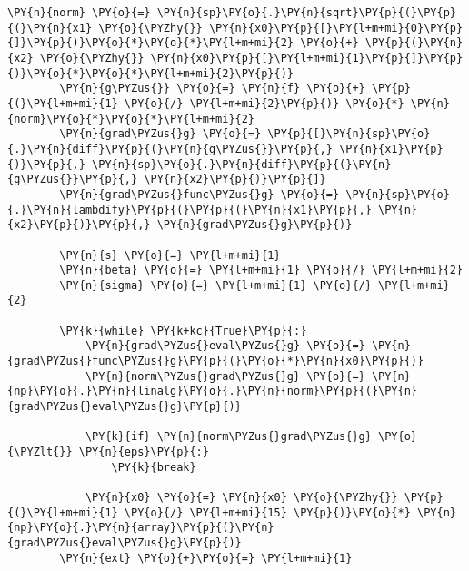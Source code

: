 \begin{itemize}
\begin{tcolorbox}[breakable, size=fbox, boxrule=1pt, pad at break*=1mm,colback=cellbackground, colframe=cellborder]
\begin{Verbatim}[commandchars=\\\{\}]
        \PY{n}{norm} \PY{o}{=} \PY{n}{sp}\PY{o}{.}\PY{n}{sqrt}\PY{p}{(}\PY{p}{(}\PY{n}{x1} \PY{o}{\PYZhy{}} \PY{n}{x0}\PY{p}{[}\PY{l+m+mi}{0}\PY{p}{]}\PY{p}{)}\PY{o}{*}\PY{o}{*}\PY{l+m+mi}{2} \PY{o}{+} \PY{p}{(}\PY{n}{x2} \PY{o}{\PYZhy{}} \PY{n}{x0}\PY{p}{[}\PY{l+m+mi}{1}\PY{p}{]}\PY{p}{)}\PY{o}{*}\PY{o}{*}\PY{l+m+mi}{2}\PY{p}{)}
        \PY{n}{g\PYZus{}} \PY{o}{=} \PY{n}{f} \PY{o}{+} \PY{p}{(}\PY{l+m+mi}{1} \PY{o}{/} \PY{l+m+mi}{2}\PY{p}{)} \PY{o}{*} \PY{n}{norm}\PY{o}{*}\PY{o}{*}\PY{l+m+mi}{2}
        \PY{n}{grad\PYZus{}g} \PY{o}{=} \PY{p}{[}\PY{n}{sp}\PY{o}{.}\PY{n}{diff}\PY{p}{(}\PY{n}{g\PYZus{}}\PY{p}{,} \PY{n}{x1}\PY{p}{)}\PY{p}{,} \PY{n}{sp}\PY{o}{.}\PY{n}{diff}\PY{p}{(}\PY{n}{g\PYZus{}}\PY{p}{,} \PY{n}{x2}\PY{p}{)}\PY{p}{]}
        \PY{n}{grad\PYZus{}func\PYZus{}g} \PY{o}{=} \PY{n}{sp}\PY{o}{.}\PY{n}{lambdify}\PY{p}{(}\PY{p}{(}\PY{n}{x1}\PY{p}{,} \PY{n}{x2}\PY{p}{)}\PY{p}{,} \PY{n}{grad\PYZus{}g}\PY{p}{)}
        
        \PY{n}{s} \PY{o}{=} \PY{l+m+mi}{1}
        \PY{n}{beta} \PY{o}{=} \PY{l+m+mi}{1} \PY{o}{/} \PY{l+m+mi}{2}
        \PY{n}{sigma} \PY{o}{=} \PY{l+m+mi}{1} \PY{o}{/} \PY{l+m+mi}{2}
        
        \PY{k}{while} \PY{k+kc}{True}\PY{p}{:}
            \PY{n}{grad\PYZus{}eval\PYZus{}g} \PY{o}{=} \PY{n}{grad\PYZus{}func\PYZus{}g}\PY{p}{(}\PY{o}{*}\PY{n}{x0}\PY{p}{)}
            \PY{n}{norm\PYZus{}grad\PYZus{}g} \PY{o}{=} \PY{n}{np}\PY{o}{.}\PY{n}{linalg}\PY{o}{.}\PY{n}{norm}\PY{p}{(}\PY{n}{grad\PYZus{}eval\PYZus{}g}\PY{p}{)}
            
            \PY{k}{if} \PY{n}{norm\PYZus{}grad\PYZus{}g} \PY{o}{\PYZlt{}} \PY{n}{eps}\PY{p}{:}
                \PY{k}{break}
            
            \PY{n}{x0} \PY{o}{=} \PY{n}{x0} \PY{o}{\PYZhy{}} \PY{p}{(}\PY{l+m+mi}{1} \PY{o}{/} \PY{l+m+mi}{15} \PY{p}{)}\PY{o}{*} \PY{n}{np}\PY{o}{.}\PY{n}{array}\PY{p}{(}\PY{n}{grad\PYZus{}eval\PYZus{}g}\PY{p}{)}
        \PY{n}{ext} \PY{o}{+}\PY{o}{=} \PY{l+m+mi}{1}


\end{Verbatim}
\end{tcolorbox}
\end{itemize}
